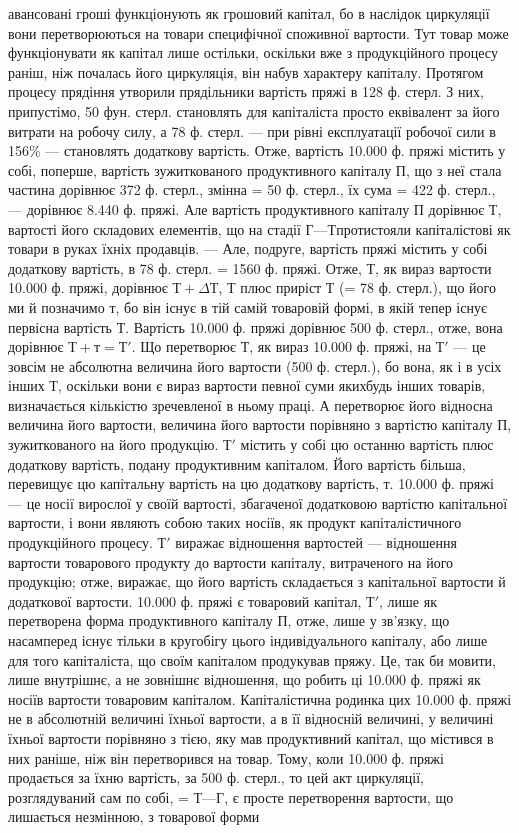 \parcont{}  %
авансовані гроші функціонують як грошовий капітал, бо в наслідок
циркуляції вони перетворюються на товари специфічної споживної
вартости. Тут товар може функціонувати як капітал лише остільки,
оскільки вже з продукційного процесу раніш, ніж почалась його циркуляція,
він набув характеру капіталу. Протягом процесу прядіння утворили
прядільники вартість пряжі в 128 ф. стерл. З них, припустімо, 50 фун.
стерл. становлять для капіталіста просто еквівалент за його витрати на
робочу силу, а 78 ф. стерл. — при рівні експлуатації робочої сили в 156\%
— становлять додаткову вартість. Отже, вартість 10.000 ф. пряжі містить у
собі, поперше, вартість зужиткованого продуктивного капіталу П, що з неї
стала частина дорівнює 372 ф. стерл., змінна = 50 ф. стерл., їх
сума = 422 ф. стерл., — дорівнює 8.440 ф. пряжі. Але вартість
продуктивного капіталу П дорівнює Т, вартості його складових елементів,
що на стадії $Г — Т п$ротистояли капіталістові як товари в руках їхніх
продавців. — Але, подруге, вартість пряжі містить у собі додаткову вартість,
в 78 ф. стерл. = 1560 ф. пряжі. Отже, Т, як вираз вартости 10.000 ф.
пряжі, дорівнює $Т + Δ Т$, $Т$ плюс приріст Т (= 78 ф. стерл.), що його ми й
позначимо т, бо він існує в тій самій товаровій формі, в якій тепер існує
первісна вартість Т. Вартість 10.000 ф. пряжі дорівнює 500 ф. стерл., отже,
вона дорівнює $Т + т = Т'$. Що перетворює Т, як вираз 10.000 ф. пряжі, на
$Т'$ — це зовсім не абсолютна величина його вартости (500 ф. стерл.), бо вона,
як і в усіх інших Т, оскільки вони є вираз вартости певної суми якихбудь
інших товарів, визначається кількістю зречевленої в ньому праці.
А перетворює його відносна величина його вартости, величина його
вартости порівняно з вартістю капіталу П, зужиткованого на його
продукцію. $Т'$ містить у собі цю останню вартість плюс додаткову
вартість, подану продуктивним капіталом. Його вартість більша, перевищує
цю капітальну вартість на цю додаткову вартість, т. 10.000 ф.
пряжі — це носії вирослої у своїй вартості, збагаченої додатковою вартістю
капітальної вартости, і вони являють собою таких носіїв, як
продукт капіталістичного продукційного процесу. $Т'$ виражає відношення
вартостей — відношення вартости товарового продукту до
вартости капіталу, витраченого на його продукцію; отже, виражає, що
його вартість складається з капітальної вартости й додаткової вартости.
10.000 ф. пряжі є товаровий капітал, $Т'$, лише як перетворена форма
продуктивного капіталу П, отже, лише у зв’язку, що насамперед існує
тільки в кругобігу цього індивідуального капіталу, або лише для того
капіталіста, що своїм капіталом продукував пряжу. Це, так би мовити,
лише внутрішнє, а не зовнішнє відношення, що робить ці 10.000 ф.
пряжі як носіїв вартости товаровим капіталом. Капіталістична родинка
цих 10.000 ф. пряжі не в абсолютній величині їхньої вартости, а в її відносній
величині, у величині їхньої вартости порівняно з тією, яку мав
продуктивний капітал, що містився в них раніше, ніж він перетворився
на товар. Тому, коли 10.000 ф. пряжі продається за їхню вартість, за
500 ф. стерл., то цей акт циркуляції, розглядуваний сам по собі, = $Т — Г$,
є просте перетворення вартости, що лишається незмінною, з товарової форми
\parbreak{}  %
